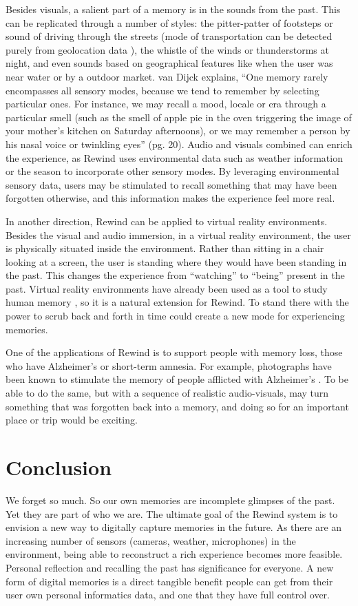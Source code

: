 \documentclass{sigchi}
\begin{document}
Besides visuals, a salient part of a memory is in the sounds from the past. This can be replicated through a number of styles: the pitter-patter of footsteps or sound of driving through the streets (mode of transportation can be detected purely from geolocation data \cite{zheng2008learning}), the whistle of the winds or thunderstorms at night, and even sounds based on geographical features like when the user was near water or by a outdoor market. van Dijck explains, ``One memory rarely encompasses all sensory modes, because we tend to remember by selecting particular ones. For instance, we may recall a mood, locale or era through a particular smell (such as the smell of apple pie in the oven triggering the image of your mother's kitchen on Saturday afternoons), or we may remember a person by his nasal voice or twinkling eyes'' \cite{van2007mediated} (pg. 20). Audio and visuals combined can enrich the experience, as Rewind uses environmental data such as weather information or the season to incorporate other sensory modes. By leveraging environmental sensory data, users may be stimulated to recall something that may have been forgotten otherwise, and this information makes the experience feel more real.

In another direction, Rewind can be applied to virtual reality environments. Besides the visual and audio immersion, in a virtual reality environment, the user is physically situated inside the environment. Rather than sitting in a chair looking at a screen, the user is standing where they would have been standing in the past. This changes the experience from ``watching'' to ``being'' present in the past. Virtual reality environments have already been used as a tool to study human memory \cite{gamberini2000virtual}, so it is a natural extension for Rewind. To stand there with the power to scrub back and forth in time could create a new mode for experiencing memories.

One of the applications of Rewind is to support people with memory loss, those who have Alzheimer's or short-term amnesia. For example, photographs have been known to stimulate the memory of people afflicted with Alzheimer's \cite{grandmaison2003critical}. To be able to do the same, but with a sequence of realistic audio-visuals, may turn something that was forgotten back into a memory, and doing so for an important place or trip would be exciting.

\section{Conclusion}
We forget so much. So our own memories are incomplete glimpses of the past. Yet they are part of who we are. The ultimate goal of the Rewind system is to envision a new way to digitally capture memories in the future. As there are an increasing number of sensors (cameras, weather, microphones) in the environment, being able to reconstruct a rich experience becomes more feasible. Personal reflection and recalling the past has significance for everyone. A new form of digital memories is a direct tangible benefit people can get from their user own personal informatics data, and one that they have full control over.
\end{document}
